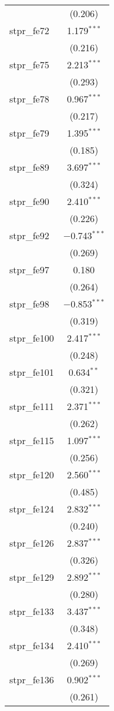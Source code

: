 \begin{table}[!htbp]
\begin{tabular}{@{\extracolsep{5pt}}lc}
  & (0.206) \\ 
  stpr\_fe72 & 1.179$^{***}$ \\ 
  & (0.216) \\ 
  stpr\_fe75 & 2.213$^{***}$ \\ 
  & (0.293) \\ 
  stpr\_fe78 & 0.967$^{***}$ \\ 
  & (0.217) \\ 
  stpr\_fe79 & 1.395$^{***}$ \\ 
  & (0.185) \\ 
  stpr\_fe89 & 3.697$^{***}$ \\ 
  & (0.324) \\ 
  stpr\_fe90 & 2.410$^{***}$ \\ 
  & (0.226) \\ 
  stpr\_fe92 & $-$0.743$^{***}$ \\ 
  & (0.269) \\ 
  stpr\_fe97 & 0.180 \\ 
  & (0.264) \\ 
  stpr\_fe98 & $-$0.853$^{***}$ \\ 
  & (0.319) \\ 
  stpr\_fe100 & 2.417$^{***}$ \\ 
  & (0.248) \\ 
  stpr\_fe101 & 0.634$^{**}$ \\ 
  & (0.321) \\ 
  stpr\_fe111 & 2.371$^{***}$ \\ 
  & (0.262) \\ 
  stpr\_fe115 & 1.097$^{***}$ \\ 
  & (0.256) \\ 
  stpr\_fe120 & 2.560$^{***}$ \\ 
  & (0.485) \\ 
  stpr\_fe124 & 2.832$^{***}$ \\ 
  & (0.240) \\ 
  stpr\_fe126 & 2.837$^{***}$ \\ 
  & (0.326) \\ 
  stpr\_fe129 & 2.892$^{***}$ \\ 
  & (0.280) \\ 
  stpr\_fe133 & 3.437$^{***}$ \\ 
  & (0.348) \\ 
  stpr\_fe134 & 2.410$^{***}$ \\ 
  & (0.269) \\ 
  stpr\_fe136 & 0.902$^{***}$ \\ 
  & (0.261) \\ 

\end{tabular}
\end{table}
